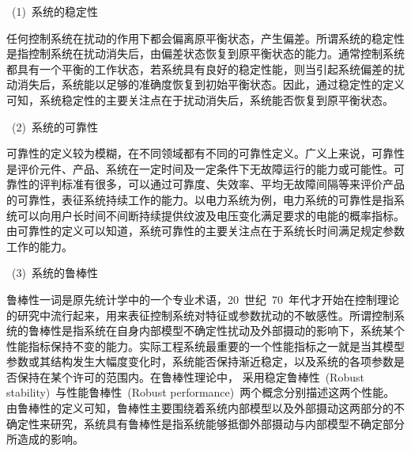 ~(1)~系统的稳定性

任何控制系统在扰动的作用下都会偏离原平衡状态，产生偏差。所谓系统的稳定性是指控制系统在扰动消失后，由偏差状态恢复到原平衡状态的能力\cite{Hu2013Automation}。通常控制系统都具有一个平衡的工作状态，若系统具有良好的稳定性能，则当引起系统偏差的扰动消失后，系统能以足够的准确度恢复到初始平衡状态。因此，通过稳定性的定义可知，系统稳定性的主要关注点在于扰动消失后，系统能否恢复到原平衡状态。

~(2)~系统的可靠性

可靠性的定义较为模糊，在不同领域都有不同的可靠性定义。广义上来说，可靠性是评价元件、产品、系统在一定时间及一定条件下无故障运行的能力或可能性。可靠性的评判标准有很多，可以通过可靠度、失效率、平均无故障间隔等来评价产品的可靠性，表征系统持续工作的能力\cite{Chen2000Reliable1,Tian2010Reliable,Wan2003Reliable2}。以电力系统为例，电力系统的可靠性是指系统可以向用户长时间不间断持续提供纹波及电压变化满足要求的电能的概率指标\cite{Guo2001Reliable3}。由可靠性的定义可以知道，系统可靠性的主要关注点在于系统长时间满足规定参数工作的能力。

~(3)~系统的鲁棒性

鲁棒性一词是原先统计学中的一个专业术语，20~世纪~70~年代才开始在控制理论的研究中流行起来，用来表征控制系统对特征或参数扰动的不敏感性\cite{Biocca2015Toward}。所谓控制系统的鲁棒性是指系统在自身内部模型不确定性扰动及外部摄动的影响下，系统某个性能指标保持不变的能力。实际工程系统最重要的一个性能指标之一就是当其模型参数或其结构发生大幅度变化时，系统能否保持渐近稳定，以及系统的各项参数是否保持在某个许可的范围内。在鲁棒性理论中，
采用稳定鲁棒性~(Robust stability)~与性能鲁棒性~(Robust performance)~两个概念分别描述这两个性能\cite{Shi2003RobustControl,Cheng2011Adaptive}。由鲁棒性的定义可知，鲁棒性主要围绕着系统内部模型以及外部摄动这两部分的不确定性来研究，系统具有鲁棒性是指系统能够抵御外部摄动与内部模型不确定部分所造成的影响。

